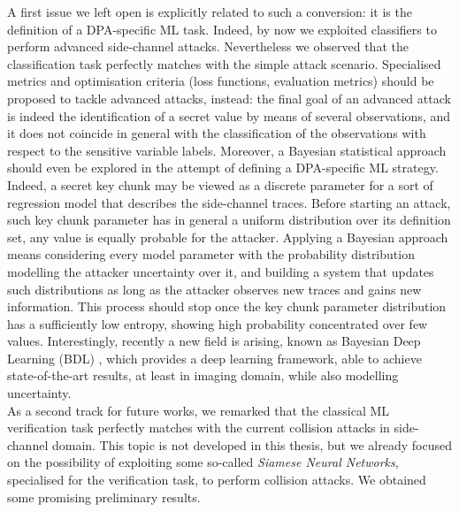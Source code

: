 A first issue we left open is explicitly related to such a conversion: it is the definition of a DPA-specific ML task. Indeed, by now we exploited classifiers to perform advanced side-channel attacks. Nevertheless we observed that the classification task perfectly matches with the simple attack scenario. Specialised metrics and optimisation criteria (\eg loss functions, evaluation metrics) should be proposed to tackle advanced attacks, instead: the final goal of an advanced attack is indeed the identification of a secret value by means of several observations, and it does not coincide in general with the classification of the observations with respect to the sensitive variable labels. Moreover, a Bayesian statistical approach should even be explored in the attempt of defining a DPA-specific ML strategy. Indeed, a secret key chunk may be viewed as a discrete parameter for a sort of regression model that describes the side-channel traces. Before starting an attack, such key chunk parameter has  in general a uniform distribution over its definition set, \ie any value is equally probable for the attacker. Applying a Bayesian approach means considering every model parameter with the probability distribution modelling the attacker uncertainty over it, and building a system that updates such distributions as long as the attacker observes new traces and gains new information. This process should stop once the key chunk parameter distribution has a sufficiently low entropy, showing high probability concentrated over few values. Interestingly, recently a new field is arising, known as Bayesian Deep Learning (BDL) \cite{gal2016uncertainty}, which provides a deep learning framework, able to achieve state-of-the-art results, at least in imaging domain, while also modelling uncertainty. \\


As a second track for future works, we remarked that the classical ML verification task perfectly matches with the current collision attacks in side-channel domain. This topic is not developed in this thesis, but we already focused on the possibility of exploiting some so-called \emph{Siamese Neural Networks}, specialised for the verification task, to perform collision attacks. We obtained some promising preliminary results. \\

